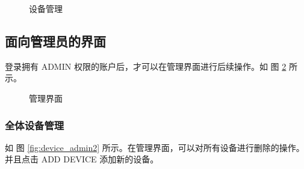 \documentclass[UTF8]{ctexart}
\begin{document}
\begin{figure}[H]
    \noindent{}
    \caption{设备管理}\label{fig:device_details3}
\end{figure}

\subsection{面向管理员的界面}
登录拥有 ADMIN 权限的账户后，才可以在管理界面进行后续操作。如 图 \ref{fig:device_admin1} 所示。
\begin{figure}[H]
    \noindent{}
    \caption{管理界面}\label{fig:device_admin1}
\end{figure}

\subsubsection{全体设备管理}
如 图 \ref{fig:device_admin2} 所示。在管理界面，可以对所有设备进行删除的操作。并且点击 ADD DEVICE 添加新的设备。
\end{document}
